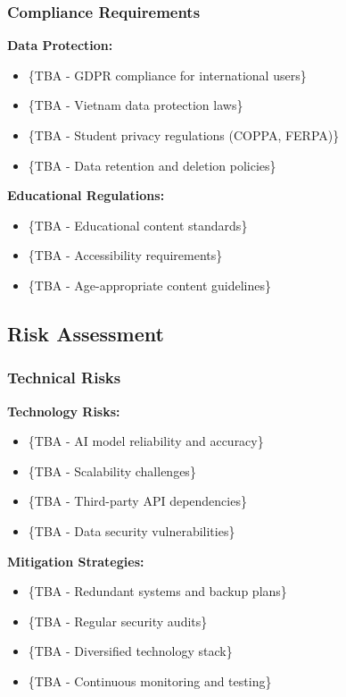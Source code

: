 \subsubsection{Compliance Requirements}
\textbf{Data Protection:}
\begin{itemize}
    \item \{TBA - GDPR compliance for international users\}
    \item \{TBA - Vietnam data protection laws\}
    \item \{TBA - Student privacy regulations (COPPA, FERPA)\}
    \item \{TBA - Data retention and deletion policies\}
\end{itemize}

\textbf{Educational Regulations:}
\begin{itemize}
    \item \{TBA - Educational content standards\}
    \item \{TBA - Accessibility requirements\}
    \item \{TBA - Age-appropriate content guidelines\}
\end{itemize}

\subsection{Risk Assessment}
\subsubsection{Technical Risks}
\textbf{Technology Risks:}
\begin{itemize}
    \item \{TBA - AI model reliability and accuracy\}
    \item \{TBA - Scalability challenges\}
    \item \{TBA - Third-party API dependencies\}
    \item \{TBA - Data security vulnerabilities\}
\end{itemize}

\textbf{Mitigation Strategies:}
\begin{itemize}
    \item \{TBA - Redundant systems and backup plans\}
    \item \{TBA - Regular security audits\}
    \item \{TBA - Diversified technology stack\}
    \item \{TBA - Continuous monitoring and testing\}
\end{itemize}

